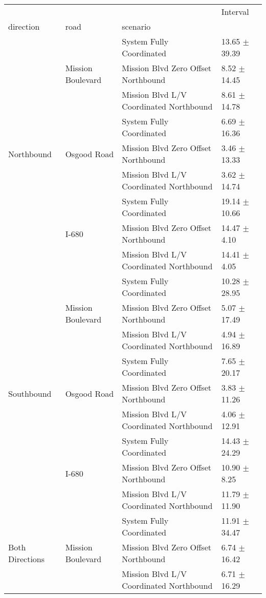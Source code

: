 \begin{tabular}{llll}
\toprule
 &  &  & Interval \\
direction & road & scenario &  \\
\midrule
\multirow[t]{9}{*}{Northbound} & \multirow[t]{3}{*}{Mission Boulevard} & System Fully Coordinated & 13.65 $\pm$ 39.39 \\
 &  & Mission Blvd Zero Offset Northbound & 8.52 $\pm$ 14.45 \\
 &  & Mission Blvd L/V Coordinated Northbound & 8.61 $\pm$ 14.78 \\
 & \multirow[t]{3}{*}{Osgood Road} & System Fully Coordinated & 6.69 $\pm$ 16.36 \\
 &  & Mission Blvd Zero Offset Northbound & 3.46 $\pm$ 13.33 \\
 &  & Mission Blvd L/V Coordinated Northbound & 3.62 $\pm$ 14.74 \\
 & \multirow[t]{3}{*}{I-680} & System Fully Coordinated & 19.14 $\pm$ 10.66 \\
 &  & Mission Blvd Zero Offset Northbound & 14.47 $\pm$ 4.10 \\
 &  & Mission Blvd L/V Coordinated Northbound & 14.41 $\pm$ 4.05 \\
\multirow[t]{9}{*}{Southbound} & \multirow[t]{3}{*}{Mission Boulevard} & System Fully Coordinated & 10.28 $\pm$ 28.95 \\
 &  & Mission Blvd Zero Offset Northbound & 5.07 $\pm$ 17.49 \\
 &  & Mission Blvd L/V Coordinated Northbound & 4.94 $\pm$ 16.89 \\
 & \multirow[t]{3}{*}{Osgood Road} & System Fully Coordinated & 7.65 $\pm$ 20.17 \\
 &  & Mission Blvd Zero Offset Northbound & 3.83 $\pm$ 11.26 \\
 &  & Mission Blvd L/V Coordinated Northbound & 4.06 $\pm$ 12.91 \\
 & \multirow[t]{3}{*}{I-680} & System Fully Coordinated & 14.43 $\pm$ 24.29 \\
 &  & Mission Blvd Zero Offset Northbound & 10.90 $\pm$ 8.25 \\
 &  & Mission Blvd L/V Coordinated Northbound & 11.79 $\pm$ 11.90 \\
\multirow[t]{9}{*}{Both Directions} & \multirow[t]{3}{*}{Mission Boulevard} & System Fully Coordinated & 11.91 $\pm$ 34.47 \\
 &  & Mission Blvd Zero Offset Northbound & 6.74 $\pm$ 16.42 \\
 &  & Mission Blvd L/V Coordinated Northbound & 6.71 $\pm$ 16.29 \\

\end{tabular}
